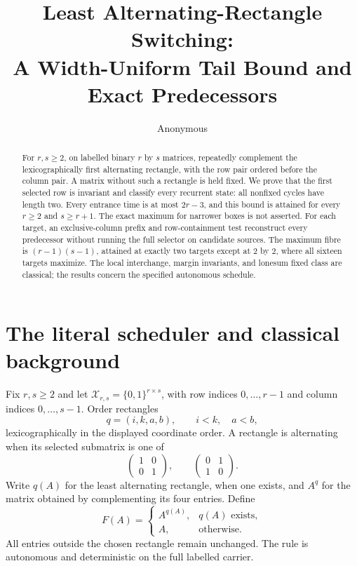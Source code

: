 \documentclass[a4paper,10pt]{amsart}
\title[Least alternating-rectangle switching]{Least Alternating-Rectangle Switching:\\
A Width-Uniform Tail Bound and Exact Predecessors}
\author{Anonymous}
\date{}
\theoremstyle{remark}
\newcommand{\X}{\mathcal X}
\begin{document}
\begin{abstract}
For $r,s\ge2$, on labelled binary $r$ by $s$ matrices, repeatedly complement the
lexicographically first alternating rectangle, with the row pair ordered
before the column pair. A matrix without such a rectangle is held fixed.
We prove that the first selected row is invariant and classify every
recurrent state: all nonfixed cycles have length two. Every entrance
time is at most $2r-3$, and this bound is attained for every $r\ge2$
and $s\ge r+1$. The exact maximum for narrower boxes is not asserted.
For each target, an exclusive-column prefix and row-containment test
reconstruct every predecessor without running the full selector on
candidate sources. The maximum fibre is $(r-1)(s-1)$, attained at exactly
two targets except at $2$ by $2$, where all sixteen targets maximize.
The local interchange, margin invariants, and lonesum fixed class are
classical; the results concern the specified autonomous schedule.
\end{abstract}
\maketitle

\section{The literal scheduler and classical background}

Fix $r,s\ge2$ and let $\X_{r,s}=\{0,1\}^{r\times s}$, with row indices
$0,\ldots,r-1$ and column indices $0,\ldots,s-1$. Order rectangles
\[
 q=(i,k,a,b),\qquad i<k,\quad a<b,
\]
lexicographically in the displayed coordinate order. A rectangle is
alternating when its selected submatrix is one of
\[
 \begin{pmatrix}1&0\\0&1\end{pmatrix},
 \qquad
 \begin{pmatrix}0&1\\1&0\end{pmatrix}.
\]
Write $q(A)$ for the least alternating rectangle, when one exists, and
$A^q$ for the matrix obtained by complementing its four entries. Define
\begin{equation}\label{eq:map}
 F(A)=
 \begin{cases}A^{q(A)},&q(A)\text{ exists},\\ A,&\text{otherwise}.\end{cases}
\end{equation}
All entries outside the chosen rectangle remain unchanged. The rule is
autonomous and deterministic on the full labelled carrier.
\end{document}
